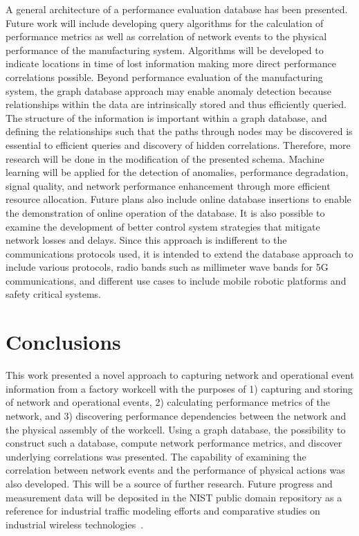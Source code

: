 A general architecture of a performance evaluation database has been presented.  Future work will include developing query algorithms for the calculation of performance metrics as well as correlation of network events to the physical performance of the manufacturing system.  Algorithms will be developed to indicate locations in time of lost information making more direct performance correlations possible.  Beyond performance evaluation of the manufacturing system, the graph database approach may enable anomaly detection because relationships within the data are intrinsically stored and thus efficiently queried.  The structure of the information is important within a graph database, and defining the relationships such that the paths through nodes may be discovered is essential to efficient queries and discovery of hidden correlations.  Therefore, more research will be done in the modification of the presented schema.  Machine learning will be applied for the detection of anomalies, performance degradation, signal quality, and network performance enhancement through more efficient resource allocation.  Future plans also include online database insertions to enable the demonstration of online operation of the database.   It is also possible to examine the development of better control system strategies that mitigate network losses and delays.  Since this approach is indifferent to the communications  protocols used, it is intended to extend the database approach to include various protocols, radio bands such as millimeter wave bands for 5G communications, and different use cases to include mobile robotic platforms and safety critical systems.

\section{Conclusions} \label{gdbappl:sec::conclusion}
This work presented a novel approach to capturing network and operational event information from a factory workcell with the  purposes of 1) capturing and storing of network and operational events, 2) calculating performance metrics of the network, and 3) discovering performance dependencies between the network and the physical assembly of the workcell.  Using a graph database, the possibility to construct such a database, compute network performance metrics, and discover underlying correlations was presented.  The capability of examining the correlation between network events and the performance of physical actions was also developed.  This will be a source of further research.  Future progress and measurement data will be deposited in the NIST public domain repository as a reference for industrial traffic modeling efforts and comparative studies on industrial wireless technologies~\cite{Candell2019PROJECTURL}.



%
